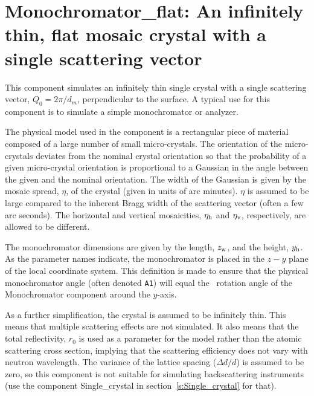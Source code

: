 
\section{Monochromator\_flat: An infinitely thin, flat mosaic crystal with
a single scattering vector}
\label{s:monochromator_flat}


This component simulates an infinitely thin single
crystal with a single scattering vector, $Q_0=2\pi / d_m$, perpendicular to the
surface. A typical
use for this component is to simulate a simple monochromator or analyzer.

The physical model used in the component is a rectangular piece of
material composed of a large number of small micro-crystals.
The orientation of the
micro-crystals deviates from the nominal crystal orientation so that the
probability of a given micro-crystal orientation is proportional to a
Gaussian in the angle between the given and the nominal orientation. The
width of the Gaussian is given by the mosaic spread, $\eta$, of the crystal
(given in units of arc minutes).
$\eta$ is assumed to be large compared to the inherent Bragg width of the
scattering vector (often a few arc seconds).
The horizontal and vertical mosaicities, $\eta_{\rm h}$ and $\eta_{\rm v}$,
respectively, are allowed to be different.

The monochromator dimensions are given by the length, $z_{\rm w}$, and
the height, $y_{\rm h}$. As the parameter names indicate, the
monochromator is placed in the $z-y$ plane of the local coordinate system. 
This definition is made to ensure that the physical monochromator angle 
(often denoted \verb+A1+) will equal the \MCS\ rotation angle 
of the Monochromator component around the $y$-axis.

As a further simplification, the crystal is assumed to be infinitely
thin. This means that multiple scattering effects are not simulated. It
also means that the total reflectivity, $r_0$ is used as a parameter for
the model rather than the atomic scattering cross section, implying that
the scattering efficiency does not vary with neutron wavelength.
The variance
of the lattice spacing ($\Delta d/d$) is assumed to be zero, so this
component is not suitable for simulating backscattering instruments (use
the component {\rm Single\_crystal}
in section~\ref{s:Single_crystal} for that).

